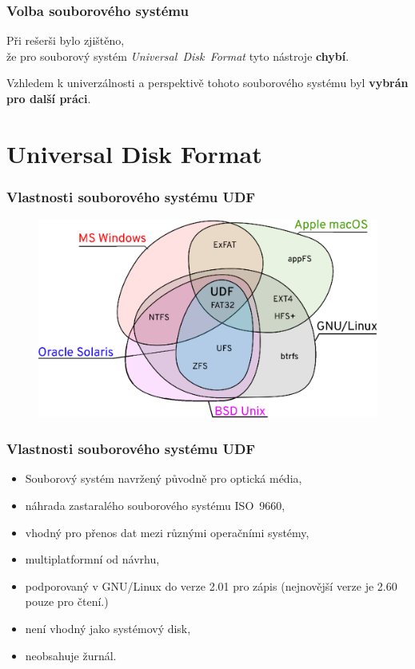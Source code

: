 \documentclass[aspectratio=169]{beamer}
\begin{document}
        \begin{frame}
            \frametitle{Volba souborového systému}
            \vspace{30pt}
            \huge
            \center
            Při rešerši bylo zjištěno,\\že pro souborový systém \textit{Universal~Disk~Format} tyto nástroje \textbf{chybí}.

            \vspace{30pt} 
            \Large
            Vzhledem k univerzálnosti a perspektivě tohoto souborového systému byl \textbf{vybrán pro další práci}.
        \end{frame}

	\section{Universal Disk Format}
		\begin{frame}
			\frametitle{Vlastnosti souborového systému UDF}
			\vspace{40 pt}
			\center
            \begin{figure}
			    \includegraphics[width=11.5cm]{udf-podpora.eps}
            \end{figure}
		\end{frame}
		\begin{frame}
			\frametitle{Vlastnosti souborového systému UDF}
            \vspace{40pt}
            \begin{itemize}
                \Large\item Souborový systém navržený původně pro optická média,
                \Large\item náhrada zastaralého souborového systému ISO~9660,
                \Large\item vhodný pro přenos dat mezi různými operačními systémy,
                \Large\item multiplatformní od návrhu,
                \Large\item podporovaný v GNU/Linux do verze 2.01 pro zápis (nejnovější verze je 2.60 pouze pro čtení.)
                \Large\item není vhodný jako systémový disk,
                \Large\item neobsahuje žurnál.
            \end{itemize}
        \end{frame}
\end{document}
